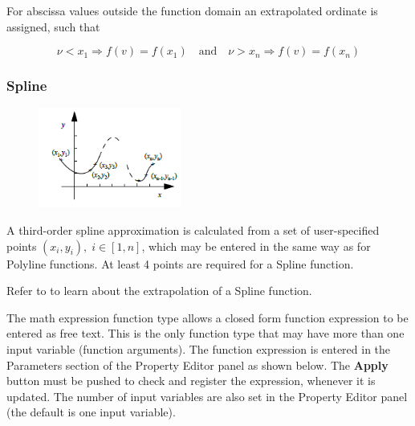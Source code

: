 For abscissa values outside the function domain an extrapolated ordinate
is assigned, such that

$$
  \nu < x_1 \Rightarrow f(v)=f(x_1)
  \quad\mbox{and}\quad
  \nu > x_n \Rightarrow f(v)=f(x_n)
$$

\subsubsection{Spline}

\begin{figure}
\vspace{-12mm}
  \includegraphics[width=0.42\textwidth]{Figures/4-Spline_numbers}
\end{figure}

A third-order spline approximation is calculated from a set of user-specified
points $(x_i,y_i),\;i\in[1,n]$, which may be entered in the same way as for
Polyline functions. At least 4 points are required for a Spline function.

Refer to  to learn about the
extrapolation of a Spline function.



The math expression function type allows a closed form function expression to be
entered as free text. This is the only function type that may have more than one
input variable (function arguments). The function expression is entered in the
Parameters section of the Property Editor panel as shown below.
The \textbf{Apply} button must be pushed to check and register the expression,
whenever it is updated. The number of input variables are also set in the
Property Editor panel (the default is one input variable).

